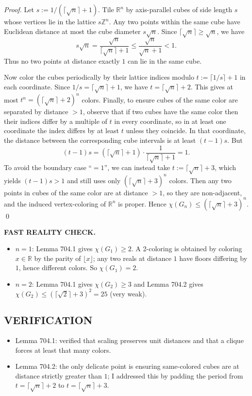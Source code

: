 \emph{Proof.}
Let $s:=1/(\lceil\sqrt{n}\rceil+1)$. Tile $\mathbb{R}^n$ by axis-parallel cubes of side length $s$ whose vertices lie in the lattice $s\mathbb{Z}^n$.
Any two points within the same cube have Euclidean distance at most the cube diameter $s\sqrt{n}$.
Since $\lceil\sqrt{n}\rceil\ge \sqrt{n}$, we have
\[s\sqrt{n}=\frac{\sqrt{n}}{\lceil\sqrt{n}\rceil+1}\le \frac{\sqrt{n}}{\sqrt{n}+1}<1.
\]
Thus no two points at distance exactly $1$ can lie in the same cube.

Now color the cubes periodically by their lattice indices modulo $t:=\lceil 1/s\rceil+1$ in each coordinate.
Since $1/s=\lceil\sqrt{n}\rceil+1$, we have $t=\lceil\sqrt{n}\rceil+2$.
This gives at most $t^n=(\lceil\sqrt{n}\rceil+2)^n$ colors.
Finally, to ensure cubes of the same color are separated by distance $>1$, observe that if two cubes have the same color then their indices differ by a multiple of $t$ in every coordinate, so in at least one coordinate the index differs by at least $t$ unless they coincide.
In that coordinate, the distance between the corresponding cube intervals is at least $(t-1)s$.
But
\[(t-1)s=(\lceil\sqrt{n}\rceil+1)\cdot \frac{1}{\lceil\sqrt{n}\rceil+1}=1.
\]
To avoid the boundary case ``$=1$'', we can instead take $t:=\lceil\sqrt{n}\rceil+3$, which yields $(t-1)s>1$ and still uses only $(\lceil\sqrt{n}\rceil+3)^n$ colors.
Then any two points in cubes of the same color are at distance $>1$, so they are non-adjacent, and the induced vertex-coloring of $\mathbb{R}^n$ is proper.
Hence $\chi(G_n)\le (\lceil\sqrt{n}\rceil+3)^n$. \qed

\medskip
\textbf{FAST REALITY CHECK.}
\begin{itemize}
\item $n=1$: Lemma 704.1 gives $\chi(G_1)\ge 2$. A 2-coloring is obtained by coloring $x\in\mathbb{R}$ by the parity of $\lfloor x\rfloor$; any two reals at distance $1$ have floors differing by $1$, hence different colors. So $\chi(G_1)=2$.
\item $n=2$: Lemma 704.1 gives $\chi(G_2)\ge 3$ and Lemma 704.2 gives $\chi(G_2)\le (\lceil\sqrt{2}\rceil+3)^2=25$ (very weak).
\end{itemize}

\subsection*{VERIFICATION}
\begin{itemize}
\item Lemma 704.1: verified that scaling preserves unit distances and that a clique forces at least that many colors.
\item Lemma 704.2: the only delicate point is ensuring same-colored cubes are at distance strictly greater than $1$; I addressed this by padding the period from $t=\lceil\sqrt{n}\rceil+2$ to $t=\lceil\sqrt{n}\rceil+3$.
\end{itemize}

